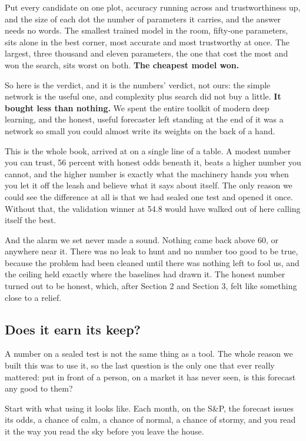 \documentclass[11pt]{article} %
\begin{document}
Put every candidate on one plot, accuracy running across and trustworthiness up, and the size of each dot the number of parameters it carries, and the answer needs no words. The smallest trained model in the room, fifty-one parameters, sits alone in the best corner, most accurate and most trustworthy at once. The largest, three thousand and eleven parameters, the one that cost the most and won the search, sits worst on both. \textbf{The cheapest model won.}

So here is the verdict, and it is the numbers' verdict, not ours: the simple network is the useful one, and complexity plus search did not buy a little. \textbf{It bought less than nothing.} We spent the entire toolkit of modern deep learning, and the honest, useful forecaster left standing at the end of it was a network so small you could almost write its weights on the back of a hand.

This is the whole book, arrived at on a single line of a table. A modest number you can trust, 56 percent with honest odds beneath it, beats a higher number you cannot, and the higher number is exactly what the machinery hands you when you let it off the leash and believe what it says about itself. The only reason we could see the difference at all is that we had sealed one test and opened it once. Without that, the validation winner at 54.8 would have walked out of here calling itself the best.

And the alarm we set never made a sound. Nothing came back above 60, or anywhere near it. There was no leak to hunt and no number too good to be true, because the problem had been cleaned until there was nothing left to fool us, and the ceiling held exactly where the baselines had drawn it. The honest number turned out to be honest, which, after Section 2 and Section 3, felt like something close to a relief.


\subsection{Does it earn its keep?}


A number on a sealed test is not the same thing as a tool. The whole reason we built this was to use it, so the last question is the only one that ever really mattered: put in front of a person, on a market it has never seen, is this forecast any good to them?

Start with what using it looks like. Each month, on the S\&P, the forecast issues its odds, a chance of calm, a chance of normal, a chance of stormy, and you read it the way you read the sky before you leave the house.
\end{document}

